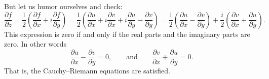 \documentclass[12pt,openany]{book}
\theoremstyle{plain}
\theoremstyle{remark}
\theoremstyle{definition}
\theoremstyle{exercise}
\theoremstyle{example}
\begin{document}
But let us humor ourselves and check:
\begin{equation*}
\frac{\partial f}{\partial \bar{z}} 
=
\frac{1}{2}
\left(
\frac{\partial f}{\partial x} + i
\frac{\partial f}{\partial y}
\right)
=
\frac{1}{2}
\left(
\frac{\partial u}{\partial x} 
+ i \frac{\partial v}{\partial x} 
+ i \frac{\partial u}{\partial y}
- \frac{\partial v}{\partial y}
\right) 
=
\frac{1}{2}
\left(
\frac{\partial u}{\partial x} 
- \frac{\partial v}{\partial y}
\right)
+
\frac{i}{2}
\left(
\frac{\partial v}{\partial x} 
+ \frac{\partial u}{\partial y}
\right) .
\end{equation*}
This expression is zero if and only if the real parts and the imaginary
parts are zero.  In other words
\begin{equation*}
\frac{\partial u}{\partial x} 
- \frac{\partial v}{\partial y}
= 0,
\qquad
\text{and}
\qquad
\frac{\partial v}{\partial x} 
+ \frac{\partial u}{\partial y} = 0
.
\end{equation*}
That is, the Cauchy--Riemann equations are satisfied.
\end{document}
